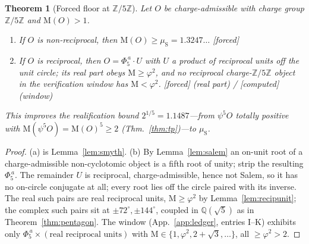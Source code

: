\documentclass[11pt]{article}
\newtheorem{theorem}{Theorem}[section]
\theoremstyle{definition}
\theoremstyle{remark}
\newcommand{\Mah}{\mathrm{M}}
\newcommand{\Z}{\mathbb{Z}}
\newcommand{\Q}{\mathbb{Q}}
\newcommand{\Adams}[1]{\psi^{#1}}
\newcommand{\gold}{\varphi}
\newcommand{\Zmod}[1]{\Z/#1\Z}
\newcommand{\status}[1]{{\small\textsf{[#1]}}}
\newcommand{\forced}{\status{forced}}
\newcommand{\computed}{\status{computed}}
\newcommand{\muS}{\mu_{\mathrm{S}}}
\begin{document}
\begin{theorem}[Forced floor at $\Zmod5$]\label{thm:z5floor}
Let $O$ be charge-admissible with charge group $\Zmod5$ and $\Mah(O)>1$.
\begin{enumerate}[label=\emph{(\alph*)},nosep]
  \item If $O$ is non-reciprocal, then $\Mah(O)\ge\muS=1.3247\ldots$ \forced{}
  \item If $O$ is reciprocal, then $O=\Phi_5^{\,a}\cdot U$ with $U$ a product of reciprocal
        units off the unit circle; its real part obeys $\Mah\ge\gold^{2}$, and no reciprocal
        charge-$\Zmod5$ object in the verification window has $\Mah<\gold^{2}$.
        \forced{} (real part) / \computed{} (window)
\end{enumerate}
This improves the realification bound $2^{1/5}=1.1487$---from $\Adams5O$ totally positive with
$\Mah(\Adams5O)=\Mah(O)^{5}\ge2$ (Thm.~\ref{thm:tp})---to $\muS$.
\end{theorem}
\begin{proof}
(a) is Lemma~\ref{lem:smyth}. (b) By Lemma~\ref{lem:salem} an on-unit root of a
charge-admissible non-cyclotomic object is a fifth root of unity; strip the resulting
$\Phi_5^{\,a}$. The remainder $U$ is reciprocal, charge-admissible, hence not Salem, so it has
no on-circle conjugate at all; every root lies off the circle paired with its inverse. The real
such pairs are real reciprocal units, $\Mah\ge\gold^{2}$ by Lemma~\ref{lem:recipunit}; the
complex such pairs sit at $\pm72^\circ,\pm144^\circ$, coupled in $\Q(\sqrt5)$ as in
Theorem~\ref{thm:pentagon}. The window (App.~\ref{app:ledger}, entries I--K) exhibits only
$\Phi_5^{\,a}\times(\text{real reciprocal units})$ with $\Mah\in\{1,\gold^{2},2+\sqrt3,\dots\}$,
all $\ge\gold^{2}>2$.
\end{proof}
\end{document}
